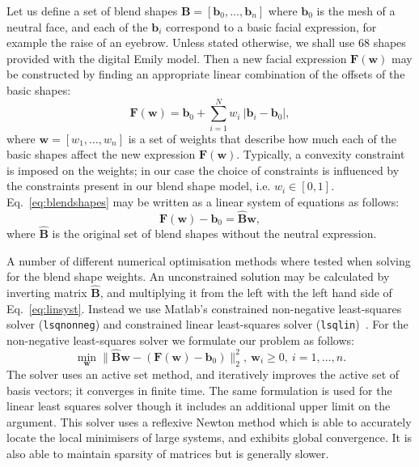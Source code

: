 \documentclass[11pt]{report}
\newcommand{\w}{\mathbf{w}}
\newcommand{\F}{\mathbf{F}}
\newcommand{\bb}{\mathbf{b}}
\begin{document}
Let us define a set of blend shapes $\mathbf{B} = [\bb_0, \ldots, \bb_n]$ where $\bb_0$ is the mesh of a neutral face, and each of the $\bb_i$ correspond to a basic facial expression, for example the raise of an eyebrow. Unless stated otherwise, we shall use $68$ shapes provided with the digital Emily model. Then a new facial expression $\mathbf{F(\w)}$ may be constructed by finding an appropriate linear combination of the offsets of the basic shapes:
\begin{equation}
	\F(\w) = \bb_0 + \sum_{i=1}^N w_i \: |\bb_i - \bb_0|, \label{eq:blendshapes}
\end{equation} where $\w = [w_1, \ldots, w_n]$ is a set of weights that describe how much each of the basic shapes affect the new expression $\mathbf{F(\w)}$. Typically, a convexity constraint is imposed on the weights; in our case the choice of constraints is influenced by the constraints present in our blend shape model, i.e. $w_i \in [0,1]$. Eq.~\ref{eq:blendshapes} may be written as a linear system of equations as follows:
\begin{equation}
	\F(\w) - \bb_0 = \hat{\mathbf{B}} \w, \label{eq:linsyst}
\end{equation} where $\hat{\mathbf{B}}$ is the original set of blend shapes without the neutral expression. 

A number of different numerical optimisation methods where tested when solving for the blend shape weights. An unconstrained solution may be calculated by inverting matrix $\hat{\mathbf{B}}$, and multiplying it from the left with the left hand side of Eq.~\ref{eq:linsyst}. Instead we use Matlab's constrained non-negative least-squares solver (\texttt{lsqnonneg}) and constrained linear least-squares solver (\texttt{lsqlin})~\cite{Matlab}. For the non-negative least-squares solver we formulate our problem as follows:
\begin{equation}
	\min_\w \| \hat{\mathbf{B}} \w - (\F(\w) - \bb_0) \|_2^2, \: \w_i \geq 0, \: i = 1, \ldots, n. \label{eq:lsqnonneg}
\end{equation} The solver uses an active set method, and iteratively improves the active set of basis vectors; it converges in finite time. The same formulation is used for the linear least squares solver though it includes an additional upper limit on the argument. This solver uses a reflexive Newton method which is able to accurately locate the local minimisers of large systems, and exhibits global convergence. It is also able to maintain sparsity of matrices but is generally slower.
\end{document}
